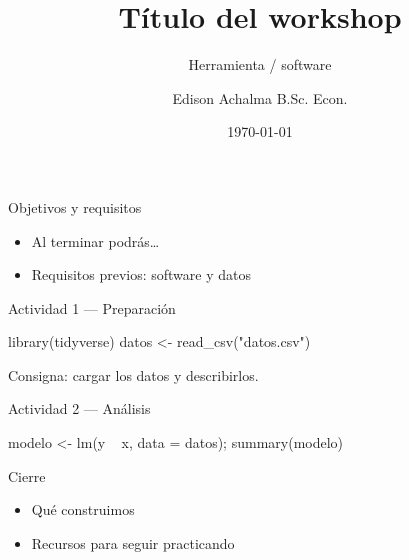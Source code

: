 \documentclass{academic-beamer}
\title{Título del workshop}
\subtitle{Herramienta / software}
\author{Edison Achalma B.Sc. Econ.}
\institute{Universidad Nacional de San Cristóbal de Huamanga}
\date{\today}
\begin{document}
\begin{frame}\titlepage\end{frame}

\begin{frame}{Objetivos y requisitos}
\begin{itemize}\item Al terminar podrás\ldots \item Requisitos previos: software y datos\end{itemize}
\end{frame}

\begin{frame}[fragile]{Actividad 1 — Preparación}
\begin{codigo}[language=R]
library(tidyverse)
datos <- read_csv("datos.csv")
\end{codigo}
\begin{nota}Consigna: cargar los datos y describirlos.\end{nota}
\end{frame}

\begin{frame}[fragile]{Actividad 2 — Análisis}
\begin{codigo}[language=R]
modelo <- lm(y ~ x, data = datos); summary(modelo)
\end{codigo}
\end{frame}

\begin{frame}{Cierre}
\begin{itemize}\item Qué construimos \item Recursos para seguir practicando\end{itemize}
\end{frame}
\end{document}
